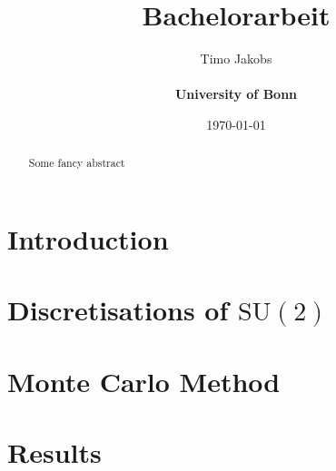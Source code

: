 \documentclass[a4paper]{scrartcl}
\title{Bachelorarbeit}
\author{Timo Jakobs \\\\ \textbf{University of Bonn}}
\date{\today}
\begin{document}
\maketitle

\begin{abstract}
Some fancy abstract
\end{abstract}

\tableofcontents
\newpage

\newcommand{\SUTwo}{$\mathrm{SU}(2)$ }




\section{Introduction}


\section{Discretisations of \SUTwo}


\newpage
\section{Monte Carlo Method}


\section{Results}


\printbibliography

\begin{appendix}

\end{appendix}
\end{document}

